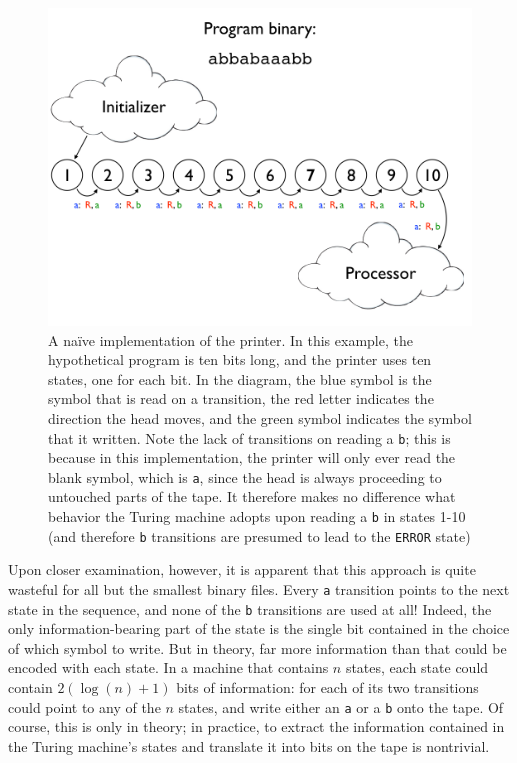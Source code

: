 \documentclass[11pt]{article}
\begin{document}
\begin{figure}
\begin{center}
\includegraphics[scale=0.42]{figs/naiveprog.png}
\caption{A na\"ive implementation of the printer. In this example, the hypothetical program is ten bits long, and the printer uses ten states, one for each bit. In the diagram, the blue symbol is the symbol that is read on a transition, the red letter indicates the direction the head moves, and the green symbol indicates the symbol that it written. Note the lack of transitions on reading a \texttt{b}; this is because in this implementation, the printer will only ever read the blank symbol, which is \texttt{a}, since the head is always proceeding to untouched parts of the tape. It therefore makes no difference what behavior the Turing machine adopts upon reading a \texttt{b} in states 1-10 (and therefore \texttt{b} transitions are presumed to lead to the \texttt{ERROR} state) \label{fig:naiveprog}}
\end{center}
\end{figure}

Upon closer examination, however, it is apparent that this approach is quite wasteful for all but the smallest binary files. Every \texttt{a} transition points to the next state in the sequence, and none of the \texttt{b} transitions are used at all! Indeed, the only information-bearing part of the state is the single bit contained in the choice of which symbol to write. But in theory, far more information than that could be encoded with each state. In a machine that contains $n$ states, each state could contain $2(\log(n) + 1)$ bits of information: for each of its two transitions could point to any of the $n$ states, and write either an \texttt{a} or a \texttt{b} onto the tape. Of course, this is only in theory; in practice, to extract the information contained in the Turing machine's states and translate it into bits on the tape is nontrivial. 
\end{document}

